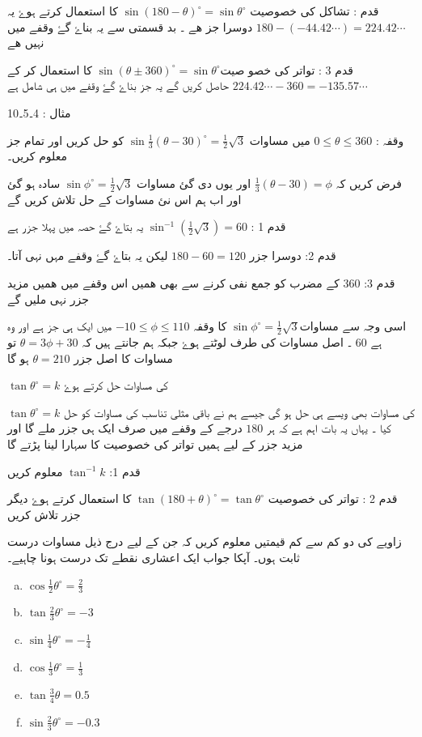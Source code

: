 قدم : تشاکل کی خصوصیت \( \sin\left(180-\theta\right)^{\circ}=\sin\theta^{\circ} \) کا استعمال کرتے ہوۓ  یہ \( 180-\left(-44.42\cdots\right)=224.42\cdots \) دوسرا جز ھے ۔ بد قسمتی سے یہ بناۓ گۓ وقفے میں نہیں ھے

قدم 3 : تواتر کی خصو صیت\( \sin(\theta\pm360)^{\circ}=\sin\theta^{\circ} \)  کا استعمال کر کے \( 224.42\cdots-360=-135.57\cdots \) حاصل کریں گے یہ جز بناۓ گۓ وقفے میں ہی شامل ہے

مثال : 4۔5۔10

وقفہ : \( 0\leqslant\theta\leqslant360 \) میں مساوات \( \sin\frac{1}{3}\left(\theta-30\right)^{\circ}=\frac{1}{2}\sqrt{3} \) کو حل کریں اور تمام جز معلوم کریں۔

فرض کریں کہ \( \frac{1}{3}\left(\theta-30\right) = \phi \) اور یوں دی گئ مساوات \( \sin\phi^{\circ}=\frac{1}{2}\sqrt{3} \)  سادہ ہو گئ اور اب ہم اس نئ مساوات کے حل تلاش کریں گے

قدم 1 : \( \sin^{-1}\left(\frac{1}{2}\sqrt{3}\right)=60 \) یہ بتاۓ گۓ حصہ میں پہلا جزر ہے

قدم 2: دوسرا جزر  \( 180-60=120 \) لیکن یہ بتاۓ گۓ وقفے مہں نہی آتا۔ 

قدم 3: \( 360 \)  کے مضرب کو جمع نفی کرنے سے بھی ھمیں اس وقفے میں ھمیں مزید جزر نہی ملیں گے 

اسی وجہ سے مساوات\( \sin\phi^{\circ}=\frac{1}{2}\sqrt{3} \)   کا وقفہ \( -10\leqslant\phi\leqslant110 \) میں ایک ہی جز ہے اور وہ ہے \( 60 \) ۔ اصل مساوات کی طرف لوٹتے ہوۓ جبکہ ہم جانتے ہیں کہ \( \theta = 3\phi+30 \) تو مساوات کا اصل  جزر \( \theta =210 \)  ہو گا 

\( \tan\theta^{\circ}=k \) کی مساوات حل کرتے ہوۓ

\( \tan\theta^{\circ}=k \) کی مساوات بھی ویسے ہی حل ہو گی جیسے ہم نے باقی مثلی تناسب کی مساوات کو حل کیا ۔ یہاں یہ بات اہم ہے کہ ہر  \( 180 \) درجے کے وقفے میں صرف ایک ہی جزر  ملے گا اور مزید جزر کے لیے ہمیں تواتر کی خصوصیت کا سہارا لینا پڑتے گا

قدم 1: \( \tan^{-1}k \) معلوم کریں

قدم 2 : تواتر کی خصوصیت \( \tan\left(180+\theta\right)^{\circ}=\tan\theta^{\circ} \)  کا استعمال کرتے ہوۓ دیگر جزر تلاش کریں









زاویے کی دو کم سے کم قیمتیں معلوم کریں کہ جن کے لیے درج ذیل مساوات درست ثابت ہوں۔ آپکا جواب ایک اعشاری نقطے تک درست ہونا چاہیے۔
\begin{multicols}{3}
\begin{enumerate}[a.]
\item \( \cos\frac{1}{2}\theta^{\circ}=\frac{2}{3} \) 
\item \( \tan\frac{2}{3}\theta^{\circ}=-3 \) 
\item \( \sin\frac{1}{4}\theta^{\circ}=-\frac{1}{4} \) 
\item \( \cos\frac{1}{3}\theta^{\circ}=\frac{1}{3} \) 
\item \( \tan\frac{3}{4}\theta=0.5 \) 
\item \( \sin\frac{2}{3}\theta^{\circ}=-0.3 \) 
\end{enumerate}
\end{multicols}


